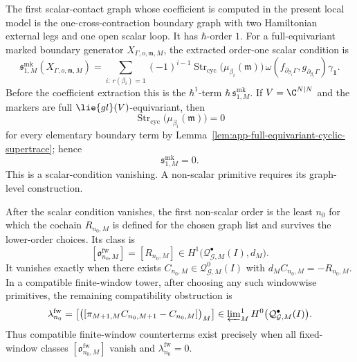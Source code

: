 \begin{thm}
  The first scalar-contact graph whose coefficient is computed
  in the present local model is the one-cross-contraction boundary graph
  with two Hamiltonian external legs and one open scalar loop.  It has
  \(\hbar\)-order \(1\).  For a full-equivariant marked boundary
  generator \(X_{\Gamma,o,\mathfrak m,M}\), the extracted order-one
  scalar condition is
  \[
    \mathfrak s^{\mathrm{mk}}_{1,M}
      (X_{\Gamma,o,\mathfrak m,M})
      =
    \sum_{i:\,r(\beta_i)=1}
      (-1)^{i-1}
      \operatorname{Str}_{\mathrm{cyc}}
        \bigl(\mu_{\beta_i}(\mathfrak m)\bigr)\,
      \omega(f_{\partial_{\beta_i}\Gamma},
             g_{\partial_{\beta_i}\Gamma})
      \gamma_{\mathbf 1}.
  \]
  Before the coefficient extraction this is the
  \(\hbar^1\)-term
  \(\hbar\,\mathfrak s^{\mathrm{mk}}_{1,M}\).
  If \(V=\C^{N|N}\) and the markers are full
  \(\lie{gl}(V)\)-equivariant, then
  \[
    \operatorname{Str}_{\mathrm{cyc}}
      \bigl(\mu_{\beta_i}(\mathfrak m)\bigr)=0
  \]
  for every elementary boundary term by
  Lemma~\ref{lem:app-full-equivariant-cyclic-supertrace}; hence
  \[
    \mathfrak s^{\mathrm{mk}}_{1,M}=0.
  \]
  This is a scalar-condition vanishing.  A non-scalar primitive requires
  its graph-level construction.

  After the scalar condition vanishes, the first non-scalar order is the least
  \(n_0\) for which the cochain \(R_{n_0,M}\) is defined for the chosen
  graph list and survives the lower-order choices.  Its
  class is
  \[
    [\mathfrak o^{\mathrm{fw}}_{n_0,M}]
      =
    [R_{n_0,M}]
      \in
    H^1\bigl(\mathcal Q^\bullet_{\mathcal G,M}(I),d_M\bigr).
  \]
  It vanishes exactly when there exists
  \(C_{n_0,M}\in\mathcal Q^0_{\mathcal G,M}(I)\) with
  \(d_M C_{n_0,M}=-R_{n_0,M}\).  In a compatible finite-window tower,
  after choosing any such windowwise primitives, the remaining
  compatibility obstruction is
  \[
    \lambda^{\mathrm{fw}}_{n_0}
      =
    \left[
      \bigl(
        [\pi_{M+1,M}C_{n_0,M+1}-C_{n_0,M}]
      \bigr)_M
    \right]
      \in
    \varprojlim\nolimits^1_M
    H^0\bigl(\mathcal Q^\bullet_{\mathcal G,M}(I)\bigr).
  \]
  Thus compatible finite-window counterterms exist precisely when all
  fixed-window classes \([\mathfrak o^{\mathrm{fw}}_{n_0,M}]\) vanish and
  \(\lambda^{\mathrm{fw}}_{n_0}=0\).


\end{thm}
